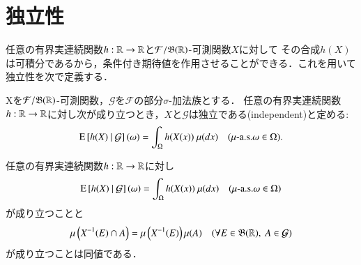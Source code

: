 \section{独立性}
	任意の有界実連続関数$h:\mathbb{R} \rightarrow \mathbb{R}$と$\mathcal{F}/\mathfrak{B}(\mathbb{R})$-可測関数$X$に対して
	その合成$h(X)$は可積分であるから，条件付き期待値を作用させることができる．これを用いて独立性を次で定義する．
	
	\begin{screen}
		\begin{dfn}[独立性]
			Xを$\mathcal{F}/\mathfrak{B}(\mathbb{R})$-可測関数，$\mathcal{G}$を$\mathcal{F}$の部分$\sigma$-加法族とする．
			任意の有界実連続関数$h:\mathbb{R} \rightarrow \mathbb{R}$に対し次が成り立つとき，$X$と$\mathcal{G}$は独立である(independent)と定める:
			\begin{align}
				\cexp{h(X)}{\mathcal{G}}(\omega) = \int_\Omega h(X(x))\ \mu(dx)
				\quad (\mbox{$\mu$-a.s.}\omega \in \Omega).
			\end{align}
		\end{dfn}
	\end{screen}

	\begin{screen}
		\begin{thm}[独立性の同値条件]
			任意の有界実連続関数$h:\mathbb{R} \rightarrow \mathbb{R}$に対し
			\begin{align}
				\cexp{h(X)}{\mathcal{G}}(\omega) = \int_\Omega h(X(x))\ \mu(dx)
				\quad (\mbox{$\mu$-a.s.}\omega \in \Omega)
				\label{eq:prp_equivalent_condition_of_independence_1}
			\end{align}
			が成り立つことと
			\begin{align}
				\mu\left( X^{-1}(E) \cap A \right) = \mu\left( X^{-1}(E) \right)\mu(A) \quad (\forall E \in \mathfrak{B}(\mathbb{R}),\ A \in \mathcal{G})
				\label{eq:prp_equivalent_condition_of_independence_2}
			\end{align}
			が成り立つことは同値である．
			\label{prp:equivalent_condition_of_independence}
		\end{thm}
	\end{screen}
	

